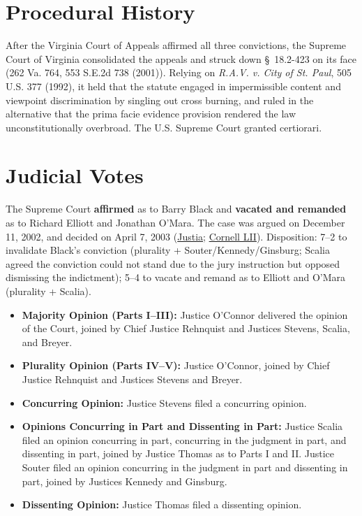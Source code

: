 \documentclass[12pt]{article}
\begin{document}
\section{Procedural History}
After the Virginia Court of Appeals affirmed all three convictions, the Supreme Court of Virginia consolidated the appeals and struck down \S~18.2-423 on its face (262 Va. 764, 553 S.E.2d 738 (2001)). Relying on \textit{R.A.V. v. City of St. Paul}, 505 U.S. 377 (1992), it held that the statute engaged in impermissible content and viewpoint discrimination by singling out cross burning, and ruled in the alternative that the prima facie evidence provision rendered the law unconstitutionally overbroad. The U.S. Supreme Court granted certiorari.

\section{Judicial Votes}
The Supreme Court \textbf{affirmed} as to Barry Black and \textbf{vacated and remanded} as to Richard Elliott and Jonathan O'Mara. The case was argued on December 11, 2002, and decided on April 7, 2003 (\href{https://supreme.justia.com/cases/federal/us/538/343/}{Justia}; \href{https://www.law.cornell.edu/supremecourt/text/538/343}{Cornell LII}). Disposition: 7--2 to invalidate Black's conviction (plurality + Souter/Kennedy/Ginsburg; Scalia agreed the conviction could not stand due to the jury instruction but opposed dismissing the indictment); 5--4 to vacate and remand as to Elliott and O'Mara (plurality + Scalia).

\begin{itemize}
    \item \textbf{Majority Opinion (Parts I--III):} Justice O'Connor delivered the opinion of the Court, joined by Chief Justice Rehnquist and Justices Stevens, Scalia, and Breyer.
    \item \textbf{Plurality Opinion (Parts IV--V):} Justice O'Connor, joined by Chief Justice Rehnquist and Justices Stevens and Breyer.
    \item \textbf{Concurring Opinion:} Justice Stevens filed a concurring opinion.
    \item \textbf{Opinions Concurring in Part and Dissenting in Part:} Justice Scalia filed an opinion concurring in part, concurring in the judgment in part, and dissenting in part, joined by Justice Thomas as to Parts I and II. Justice Souter filed an opinion concurring in the judgment in part and dissenting in part, joined by Justices Kennedy and Ginsburg.
    \item \textbf{Dissenting Opinion:} Justice Thomas filed a dissenting opinion.
\end{itemize}
\end{document}
